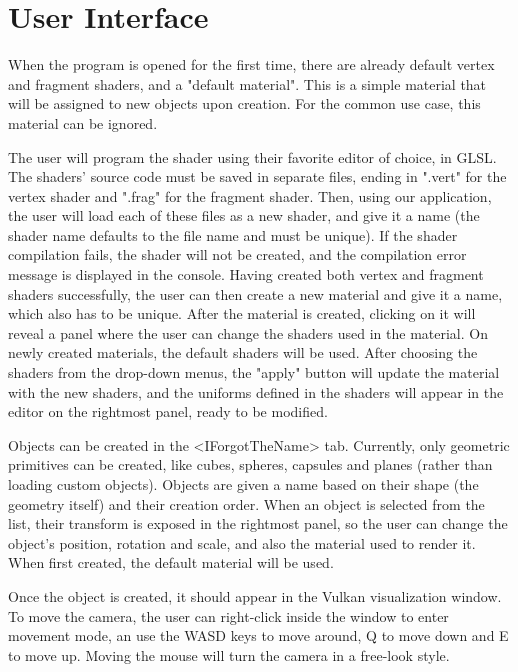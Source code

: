 \section{User Interface}
When the program is opened for the first time, there are already default vertex and fragment shaders, and a "default material". This is a simple material that will be assigned to new objects upon creation. For the common use case, this material can be ignored.

The user will program the shader using their favorite editor of choice, in GLSL. The shaders' source code must be saved in separate files, ending in ".vert" for the vertex shader and ".frag" for the fragment shader. Then, using our application, the user will load each of these files as a new shader, and give it a name (the shader name defaults to the file name and must be unique). If the shader compilation fails, the shader will not be created, and the compilation error message is displayed in the console. Having created both vertex and fragment shaders successfully, the user can then create a new material and give it a name, which also has to be unique. After the material is created, clicking on it will reveal a panel where the user can change the shaders used in the material. On newly created materials, the default shaders will be used. After choosing the shaders from the drop-down menus, the "apply" button will update the material with the new shaders, and the uniforms defined in the shaders will appear in the editor on the rightmost panel, ready to be modified.

Objects can be created in the <IForgotTheName> tab. Currently, only geometric primitives can be created, like cubes, spheres, capsules and planes (rather than loading custom objects). Objects are given a name based on their shape (the geometry itself) and their creation order. When an object is selected from the list, their transform is exposed in the rightmost panel, so the user can change the object's position, rotation and scale, and also the material used to render it. When first created, the default material will be used.

Once the object is created, it should appear in the Vulkan visualization window. To move the camera, the user can right-click inside the window to enter movement mode, an use the WASD keys to move around, Q to move down and E to move up. Moving the mouse will turn the camera in a free-look style.
